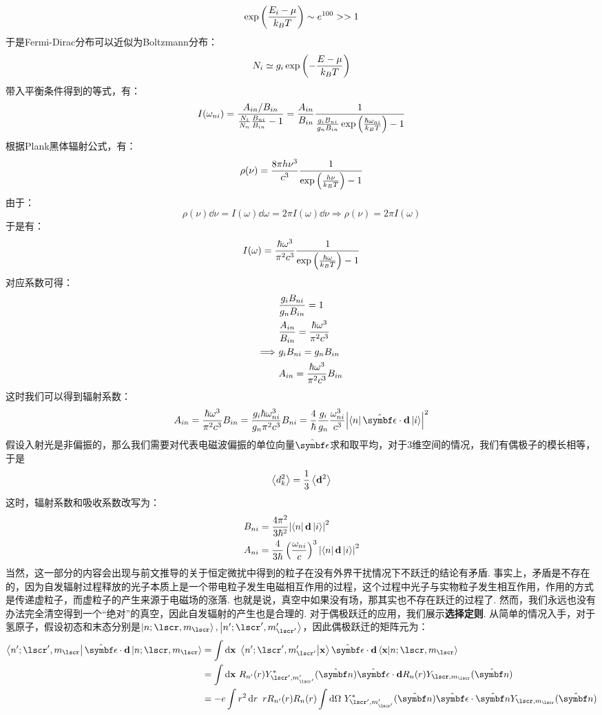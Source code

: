 \[
\exp\left({\frac{E_{i}-\mu}{k_{B}T}}\right) \sim e^{100} >> 1
\]
于是Fermi-Dirac分布可以近似为Boltzmann分布：
\[
N_{i} \simeq g_{i}\exp\left({-\frac{E-\mu}{k_{B}T}}\right)
\]
带入平衡条件得到的等式，有：
\[
I(\omega_{ni}) = \frac{A_{in}/B_{in}}{\frac{N_{i}}{N_{n}}\frac{B_{ni}}{B_{in}} - 1} = \frac{A_{in}}{B_{in}}\frac{1}{\frac{g_{i}B_{ni}}{g_{n}B_{in}}\exp\left({\frac{\hbar\omega_{ni}}{k_{B}T}}\right)-1}
\]
根据Plank黑体辐射公式，有：
\[
\rho(\nu) = \frac{8\pi h\nu^{3}}{c^{3}}\frac{1}{\exp\left({\frac{h\nu}{k_{B}T}}\right) - 1}
\]
由于：
\[
\rho(\nu)\dd\nu = I(\omega)\dd\omega = 2\pi I(\omega)\dd\nu \Longrightarrow \rho(\nu) = 2\pi I(\omega) 
\]
于是有：
\[
I(\omega) = \frac{\hbar\omega^{3}}{\pi^{2}c^{3}}\frac{1}{\exp\left({\frac{\hbar\omega}{k_{B}T}}\right) - 1}
\]
对应系数可得：
\begin{align*}
& \frac{g_{i}B_{ni}}{g_{n}B_{in}} = 1 \\
& \frac{A_{in}}{B_{in}} = \frac{\hh\omega^{3}}{\pi^{2}c^{3}} \\
\Longrightarrow\ 
& g_{i}B_{ni} = g_{n}B_{in} \\
& A_{in} = \frac{\hh\omega^{3}}{\pi^{2}c^{3}}B_{in}
\end{align*}
这时我们可以得到辐射系数：
\[
A_{in} = \frac{\hh\omega^{3}}{\pi^{2}c^{3}}B_{in} = \frac{g_{i}\hh\omega_{ni}^{3}}{g_{n}\pi^{2}c^{3}}B_{ni} = \frac{4}{\hh}\frac{g_{i}}{g_{n}}\frac{\omega_{ni}^{3}}{c^{3}}\abs{\bra{n}\uv{\epsilon}\cdot\mathbf{d}\ket{i}}^{2}
\]
假设入射光是非偏振的，那么我们需要对代表电磁波偏振的单位向量\(\uv{\epsilon}\)求和取平均，对于3维空间的情况，我们有偶极子的模长相等，于是
\[
\left\langle{d_{k}^{2}}\right\rangle = \frac{1}{3}\left\langle{\mathbf{d}^{2}}\right\rangle
\]
这时，辐射系数和吸收系数改写为：
\begin{align*}
& B_{ni} = \frac{4\pi^{2}}{3\hbar^{2}}\abs{\bra{n}\mathbf{d}\ket{i}}^{2} \\
& A_{ni} = \frac{4}{3\hbar}\left({\frac{\omega_{ni}}{c}}\right)^{3}\abs{\bra{n}\mathbf{d}\ket{i}}^{2} 
\end{align*}
当然，这一部分的内容会出现与前文推导的关于恒定微扰中得到的粒子在没有外界干扰情况下不跃迁的结论有矛盾. 事实上，矛盾是不存在的，因为自发辐射过程释放的光子本质上是一个带电粒子发生电磁相互作用的过程，这个过程中光子与实物粒子发生相互作用，作用的方式是传递虚粒子，而虚粒子的产生来源于电磁场的涨落. 也就是说，真空中如果没有场，那其实也不存在跃迁的过程了. 然而，我们永远也没有办法完全清空得到一个“绝对”的真空，因此自发辐射的产生也是合理的. 对于偶极跃迁的应用，我们展示\textbf{选择定则}. 从简单的情况入手，对于氢原子，假设初态和末态分别是\(\ket{n;\lscr,m_{\lscr}},\ket{n';\lscr',m'_{\lscr'}}\)，因此偶极跃迁的矩阵元为：
\begin{align*}
\bra{n';\lscr',m_{\lscr}}\uv{\epsilon}\cdot\mathbf{d}\ket{n;\lscr,m_{\lscr}} 
& = \int\dd\vr\ \bra{n';\lscr',m_{\lscr'}'}\ket{\vr}\uv{\epsilon}\cdot\mathbf{d}\bra{\vr}\ket{n;\lscr,m_{\lscr}} \\
& = \int\dd\vr\ \Rcal_{n'}(r)Y^{*}_{\lscr',m_{\lscr'}'}(\uv{n})\uv{\epsilon}\cdot\mathbf{d} \Rcal_{n}(r)Y_{\lscr,m_{\lscr}}(\uv{n}) \\
& = -e\int r^{2}\dd{r}\ r\Rcal_{n'}(r)\Rcal_{n}(r)\int\dd\Omega\ Y^{*}_{\lscr',m_{\lscr'}'}(\uv{n})\uv{\epsilon}\cdot\uv{n} Y_{\lscr,m_{\lscr}}(\uv{n})
\end{align*}

